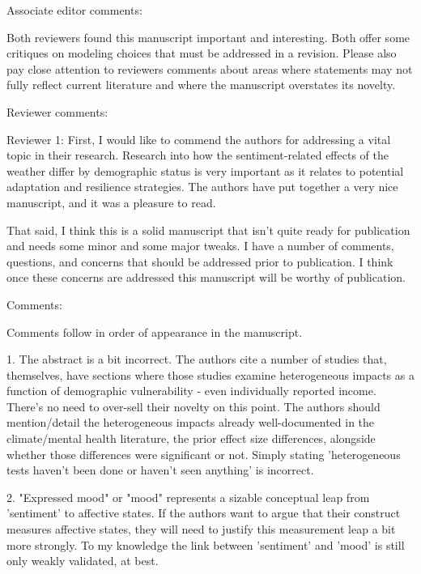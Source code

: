 Associate editor comments:

Both reviewers found this manuscript important and interesting. Both offer some critiques on modeling choices that must be addressed in a revision. Please also pay close attention to reviewers comments about areas where statements may not fully reflect current literature and where the manuscript overstates its novelty.



Reviewer comments:


Reviewer 1: First, I would like to commend the authors for addressing a vital topic in their research. Research into how the sentiment-related effects of the weather differ by demographic status is very important as it relates to potential adaptation and resilience strategies. The authors have put together a very nice manuscript, and it was a pleasure to read.

That said, I think this is a solid manuscript that isn't quite ready for publication and needs some minor and some major tweaks. I have a number of comments, questions, and concerns that should be addressed prior to publication. I think once these concerns are addressed this manuscript will be worthy of publication.

Comments:

Comments follow in order of appearance in the manuscript.

1. The abstract is a bit incorrect. The authors cite a number of studies that, themselves, have sections where those studies examine heterogeneous impacts as a function of demographic vulnerability - even individually reported income. There's no need to over-sell their novelty on this point. The authors should mention/detail the heterogeneous impacts already well-documented in the climate/mental health literature, the prior effect size differences, alongside whether those differences were significant or not. Simply stating 'heterogeneous tests haven't been done or haven't seen anything' is incorrect.

2. "Expressed mood" or "mood" represents a sizable conceptual leap from 'sentiment' to affective states. If the authors want to argue that their construct measures affective states, they will need to justify this measurement leap a bit more strongly. To my knowledge the link between 'sentiment' and 'mood' is still only weakly validated, at best.

